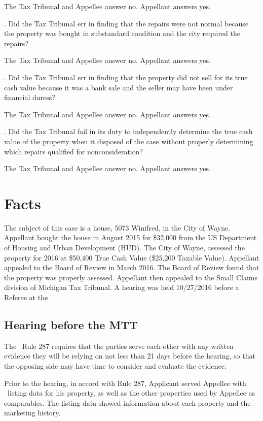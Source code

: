 \documentclass[12pt,\documentclassflag]{michiganCourtOfAppealsBrief}
\begin{document}
The Tax Tribunal and Appellee answer no. Appellant answers yes. 


. Did the Tax Tribunal err in finding that the repairs were not normal because the property was bought in substandard condition  and the city required the repairs?

The Tax Tribunal and Appellee answer no. Appellant answers yes.


. Did the Tax Tribunal err in finding that the property did not sell for its true cash value because it was a bank sale and the seller may have been under financial duress?

The Tax Tribunal and Appellee answer no. Appellant answers yes. 


. Did the Tax Tribunal fail in its duty to independently determine the true cash value of the property when it disposed of the case without properly determining which repairs qualified for nonconsideration?

The Tax Tribunal and Appellee answer no. Appellant answers yes.


\section{Facts}
The subject of this case is a house, 5073 Winifred, in the City of Wayne. Appellant bought the house in August 2015 for \$32,000 from the US Department of Housing and Urban Development (HUD). The City of Wayne, assessed the property for 2016 at \$50,400 True Cash Value (\$25,200 Taxable Value). Appellant appealed to the Board of Review in March 2016. The Board of Review found that the property was properly assessed. Appellant then appealed to the Small Claims division of Michigan Tax Tribunal. A hearing was held 10/27/2016 before a Referee at the \MTT.

\subsection{Hearing before the MTT}

The \MTT\ Rule 287 requires that the parties serve each other with any written evidence they will be relying on not less than 21 days before the hearing, so that the opposing side may have time to consider and evaluate the evidence.

Prior to the hearing, in accord with Rule 287, Applicant served Appellee with \MLS\ listing data for his property, as well as the other properties used by Appellee as comparables. The listing data showed information about each property and the marketing history. 
\end{document}
